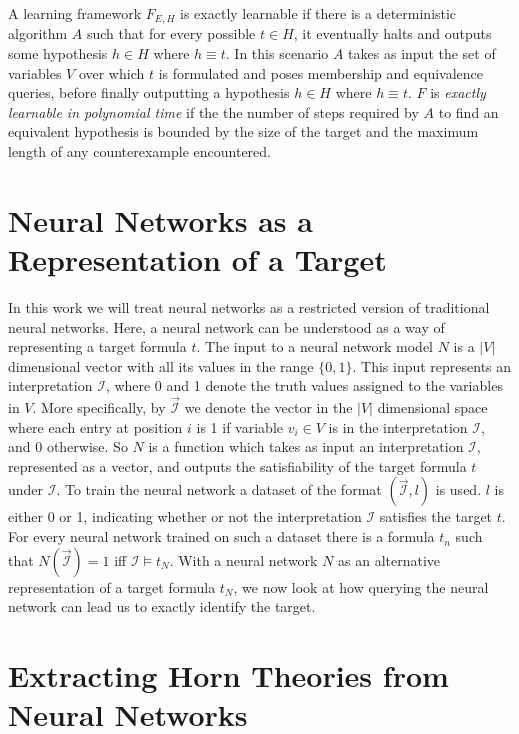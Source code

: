 A learning framework $F_{E, H}$ is exactly learnable if there is a deterministic algorithm $A$ such that for every possible $t\in H$, it eventually halts and outputs some hypothesis $h \in H$ where $h \equiv t$. In this scenario $A$ takes as input the set of variables $V$ over which $t$ is formulated and poses membership and equivalence queries, before finally outputting a hypothesis $h \in H$ where $h \equiv t$. $F$ is \emph{exactly learnable in polynomial time} if the the number of steps required by $A$ to find an equivalent hypothesis is bounded by the size of the target and the maximum length of any counterexample encountered.


\section{Neural Networks as a Representation of a Target}
In this work we will treat neural networks as a restricted version of traditional neural networks. Here, a neural network can be understood as a way of representing a target formula $t$. The input to a neural network model $N$ is a $|V|$ dimensional vector with all its values in the range $\{0, 1\}$. This input represents an interpretation $\mathcal{I}$, where 0 and 1 denote the truth values assigned to the variables in $V$. More specifically, by $\overrightarrow{\mathcal{I}}$ we denote the vector in the $|V|$ dimensional space where each entry at position $i$ is 1 if variable $v_i \in V$ is in the interpretation $\mathcal{I}$, and 0 otherwise. So $N$ is a function which takes as input an interpretation $\mathcal{I}$, represented as a vector, and outputs the satisfiability of the target formula $t$ under $\mathcal{I}$.
To train the neural network a dataset of the format $(\overrightarrow{\mathcal{I}}, l)$ is used. $l$ is either 0 or 1, indicating whether or not the interpretation $\mathcal{I}$ satisfies the target $t$. For every neural network trained on such a dataset there is a formula $t_n$ such that $N(\overrightarrow{\mathcal{I}}) = 1$ iff $\mathcal{I} \models t_N$. With a neural network $N$ as an alternative representation of a target formula $t_N$, we now look at how querying the neural network can lead us to exactly identify the target. 


\section{Extracting Horn Theories from Neural Networks}


